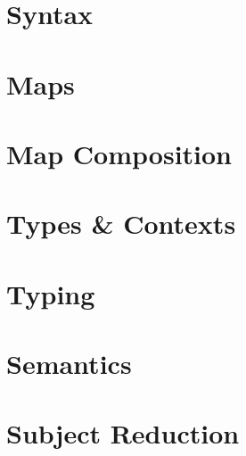 \documentclass[sigplan,10pt]{acmart}
\begin{document}
  \section{Syntax}
  \KVariables
  \KModeTy
  \KTerms
  \FMode
  \FSyntax
  \FTerms

  \section{Maps}
  \KKit
  \KMap
  \KAp
  \KExt
  \KLift
  \KId
  \KSingle
  \KWeaken
  \KEq
  \KFunExt
  \KIdLift
  \KKitNotation
  \KTraversal
  \KKitInstances
  \KKitOpen
  \FTraversalOp
  \FTraversalId
  \FTraversal

  \section{Map Composition}
  \KWkKit
  \KWkKitInstances
  \KComposeKit
  \KComposition
  \KComposeKitAp
  \KDistLiftCompose
  \KComposeKitNotation
  \KComposeTraversal
  \KCommLiftWeaken
  \KCommLiftWeakenTraverse
  \KComposeKitInstances
  \KComposeKitInstancesConcrete
  \KWeakenCancelsSingle
  \KWeakenCancelsSingleTraverse
  \KDistLiftSingle
  \KDistLiftSingleTraverse
  \FAssoc
  \FComposeTraversal

  \section{Types \& Contexts}
  \KTypeModes
  \KTypes
  \KContextHelper
  \KContexts
  \KContextLookup
  \FTypes

  \section{Typing}
  \KVariableTyping
  \KTyping
  \KTypingKit
  \KMapTyping
  \KLiftTyping
  \KSingleTyping
  \KTypingNotation
  \KTypingTraversal
  \KTypingInstances
  \KTypingTraversalNotation
  \FTyping
  \FTypingInst
  \FPreserve
  \FTypingTraversal

  \section{Semantics}
  \FValues
  \FReduction

  \section{Subject Reduction}
  \FSubjectReduction

  

  \clearpage
  \appendix
\end{document}
